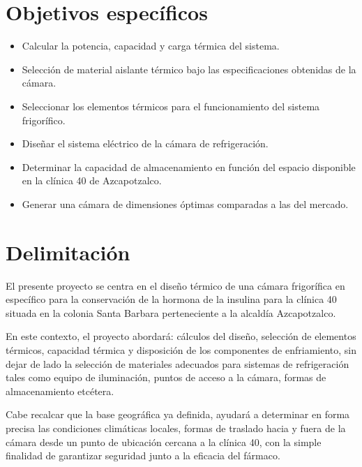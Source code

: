\section*{Objetivos específicos}

\begin{itemize}
	\item	Calcular la potencia, capacidad y carga térmica del sistema. 
	\item	Selección de material aislante térmico bajo las especificaciones obtenidas de la cámara.
	\item	Seleccionar los elementos térmicos para el funcionamiento del sistema frigorífico.
	\item	Diseñar el sistema eléctrico de la cámara de refrigeración. 
	\item	Determinar la capacidad de almacenamiento en función del espacio disponible en la clínica 40 de Azcapotzalco.
	\item	Generar una cámara de dimensiones óptimas comparadas a las del mercado.
	
\end{itemize}

\newpage
\section*{Delimitación}
 
El presente proyecto se centra en el diseño térmico de una cámara frigorífica en específico para la conservación de la hormona de la insulina para la clínica 40 situada en la colonia Santa Barbara perteneciente a la alcaldía Azcapotzalco.

En este contexto, el proyecto abordará: cálculos del diseño, selección de elementos térmicos, capacidad térmica y disposición de los componentes de enfriamiento, sin dejar de lado la selección de materiales adecuados para sistemas de refrigeración tales como equipo de iluminación, puntos de acceso a la cámara, formas de almacenamiento etcétera. 

Cabe recalcar que la base geográfica ya definida, ayudará a determinar en forma precisa las condiciones climáticas locales, formas de traslado hacia y fuera de la cámara desde un punto de ubicación cercana a la clínica 40, con la simple finalidad de garantizar seguridad junto a la eficacia del fármaco. 





